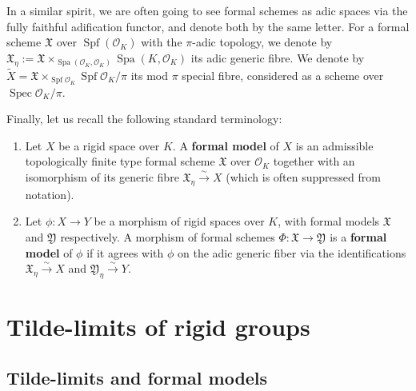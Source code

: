 \documentclass[10pt,oneside]{amsart}
\theoremstyle{definition}
\begin{document}
	In a similar spirit, we are often going to see formal schemes as adic spaces via the fully faithful adification functor, and denote both by the same letter. 
	For a formal scheme $\mathfrak X$ over $\operatorname{Spf}(\mathcal O_K)$ with the $\pi$-adic topology, we denote by $\mathfrak X_\eta:=\mathfrak X\times_{\operatorname{Spa}(\mathcal O_K,\mathcal O_K)}\operatorname{Spa}(K,\mathcal O_K)$ its adic generic fibre. 
	We denote by $\tilde{X}=\mathfrak X\times_{\operatorname{Spf}\mathcal O_K}\operatorname{Spf}\mathcal O_K/\pi$ its mod $\pi$ special fibre, considered as a scheme over $\operatorname{Spec}\mathcal O_K/\pi$. 

	Finally, let us recall the following standard terminology: 
		\begin{enumerate}
			\item Let $X$ be a rigid space over $K$. A \textbf{formal model} of $X$ is an admissible topologically finite type formal scheme $\mathfrak X$ over $\mathcal O_K$ together with an isomorphism of its generic fibre $\mathfrak X_\eta \xrightarrow{\sim} X$ (which is often suppressed from notation).
			\item Let $\phi:  X\rightarrow  Y$ be a morphism of rigid spaces over $K$, with formal models $\mathfrak X$ and $\mathfrak Y$	respectively. A morphism of formal schemes $\Phi:\mathfrak X \rightarrow \mathfrak Y$ is a \textbf{formal model} of $\phi$ if it agrees with $\phi$ on the adic generic fiber via the identifications $\mathfrak X_\eta \xrightarrow{\sim} X$ and $\mathfrak Y_\eta \xrightarrow{\sim} Y$.
		\end{enumerate}


	
	\section{Tilde-limits of rigid groups} \label{section:tilde_limit}
  
	

		\subsection{Tilde-limits and formal models} 
		
\end{document}
